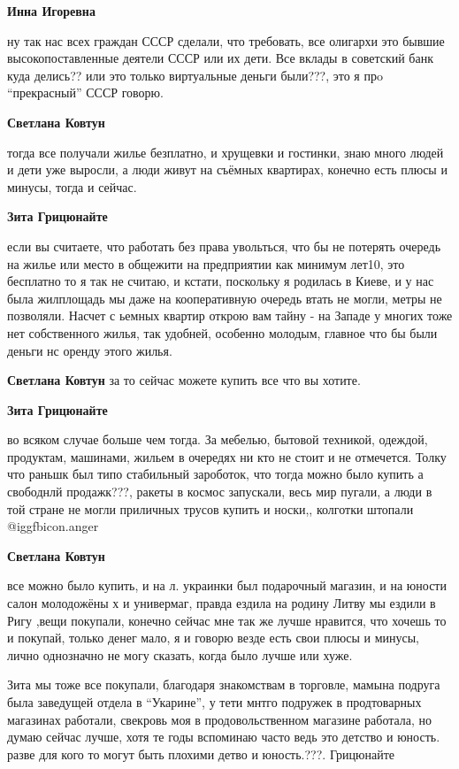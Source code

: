 \begin{itemize}
\begin{itemize}
\begin{itemize}
\textbf{Инна Игоревна} 

ну так нас всех граждан СССР сделали, что требовать, все олигархи это бывшие
высокопоставленные деятели СССР или их дети. Все вклады в советский банк куда
делись?? или это только виртуальные деньги были???, это я прo \enquote{прекрасный} СССР
говорю.

\textbf{Светлана Ковтун} 

тогда все получали жилье безплатно, и хрущевки и гостинки, знаю много людей и
дети уже выросли, а люди живут на съёмных квартирах, конечно есть плюсы и
минусы, тогда и сейчас.

\textbf{Зита Грицюнайте} 

если вы считаете, что работать без права увольться, что бы не потерять очередь
на жилье или место в общежити на предприятии как минимум лет10, это бесплатно то
я так не считаю, и кстати, поскольку я родилась в Киеве, и у нас была жилплощадь
мы даже на кооперативную очередь втать не могли, метры не позволяли. Насчет с
ьемных квартир открою вам тайну - на Западе у многих тоже нет собственного
жилья, так удобней, особенно молодым, главное что бы были деньги нс оренду этого
жилья.

\textbf{Светлана Ковтун} за то сейчас можете купить все что вы хотите.

\textbf{Зита Грицюнайте} 

во всяком случае больше чем тогда. За мебелью, бытовой
техникой, одеждой, продуктам, машинами, жильем в очередях ни кто не стоит и не
отмечется. Толку что раньшк был типо стабильный зароботок, что тогда можно было
купить а свободнлй продажк???, ракеты в космос запускали, весь мир пугали, а люди
в той стране не могли приличных трусов купить и носки,, колготки штопали @igg{fbicon.anger} 

\textbf{Светлана Ковтун} 

все можно было купить, и на л. украинки был подарочный магазин, и на юности
салон молодожёны х и универмаг, правда ездила на родину Литву мы ездили в Ригу
,вещи покупали, конечно сейчас мне так же лучше нравится, что хочешь то и
покупай, только денег мало, я и говорю везде есть свои плюсы и минусы, лично
однозначно не могу сказать, когда было лучше или хуже.


Зита мы тоже все покупали, благодаря знакомствам в торговле, мамына подруга была
заведущей отдела в \enquote{Укарине}, у тети мнтго подружек в продтоварных магазинах
работали, свекровь моя в продовольственном магазине работала, но думаю сейчас
лучше, хотя те годы вспоминаю часто ведь это детство и юность. разве для кого то
могут быть плохими детво и юность.???. Грицюнайте


\end{itemize}
\end{itemize}
\end{itemize}
